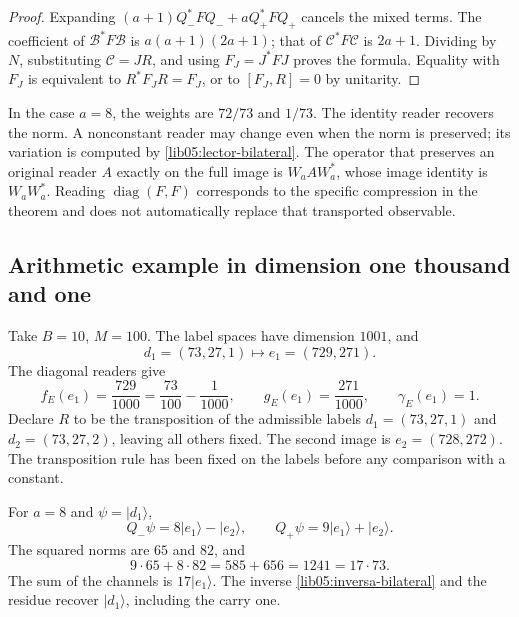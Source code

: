 \begin{proof}
Expanding \((a+1)Q_-^*FQ_-+aQ_+^*FQ_+\) cancels the
mixed terms. The coefficient of \(\mathcal B^*F\mathcal B\)
is \(a(a+1)(2a+1)\); that of
\(\mathcal C^*F\mathcal C\) is \(2a+1\). Dividing by
\(N\), substituting \(\mathcal C=JR\), and using
\(F_J=J^*FJ\) proves the formula. Equality with \(F_J\)
is equivalent to \(R^*F_JR=F_J\), or to \([F_J,R]=0\) by
unitarity.
\end{proof}

In the case \(a=8\), the weights are \(72/73\) and \(1/73\).
The identity reader recovers the norm. A nonconstant reader
may change even when the norm is preserved; its variation is
computed by \eqref{lib05:lector-bilateral}.
The operator that preserves an original reader \(A\) exactly
on the full image is \(W_aAW_a^*\), whose image identity
is \(W_aW_a^*\). Reading \(\operatorname{diag}(F,F)\) corresponds
to the specific compression in the theorem and does not
automatically replace that transported observable.

\subsection{Arithmetic example in dimension one thousand and one}
\label{lib05:ejemplo}

Take \(B=10\), \(M=100\). The label spaces have
dimension \(1001\), and
\begin{equation}
 d_1=(73,27,1)\longmapsto e_1=(729,271).
 \label{lib05:ejemplo-etiqueta}
\end{equation}
The diagonal readers give
\begin{equation}
 f_E(e_1)=\frac{729}{1000}
 =\frac{73}{100}-\frac1{1000},\qquad
 g_E(e_1)=\frac{271}{1000},\qquad \gamma_E(e_1)=1.
 \label{lib05:ejemplo-lectores}
\end{equation}
Declare \(R\) to be the transposition of the admissible
labels \(d_1=(73,27,1)\) and \(d_2=(73,27,2)\), leaving
all others fixed. The second image is \(e_2=(728,272)\).
The transposition rule has been fixed on the labels before
any comparison with a constant.

For \(a=8\) and \(\psi=|d_1\rangle\),
\begin{equation}
 Q_-\psi=8|e_1\rangle-|e_2\rangle,\qquad
 Q_+\psi=9|e_1\rangle+|e_2\rangle.
 \label{lib05:ejemplo-canales}
\end{equation}
The squared norms are \(65\) and \(82\), and
\begin{equation}
 9\cdot65+8\cdot82=585+656=1241=17\cdot73.
 \label{lib05:ejemplo-balance}
\end{equation}
The sum of the channels is \(17|e_1\rangle\). The inverse
\eqref{lib05:inversa-bilateral} and the residue recover
\(|d_1\rangle\), including the carry one.

